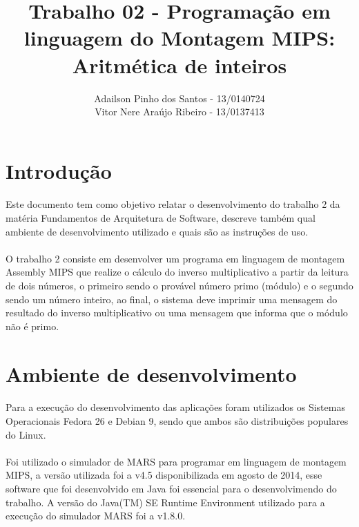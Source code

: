 \documentclass[a4paper, 12pt]{article}
\begin{document}
\title{Trabalho 02 - Programa\c{c}\~ao em linguagem do Montagem MIPS: Aritm\'etica de inteiros}
\author{Adailson Pinho dos Santos - 13/0140724\\
Vitor Nere Ara\'ujo Ribeiro - 13/0137413}
\date{}
\maketitle

\newpage

\tableofcontents

\newpage

\section{Introdu\c{c}\~ao}
	\paragraph{}	Este documento tem como objetivo relatar o desenvolvimento do trabalho 2 da mat\'eria Fundamentos de Arquitetura de Software, descreve tamb\'em qual ambiente de desenvolvimento utilizado e quais s\~ao as instru\c{c}\~oes de uso. 
	\paragraph{}	O trabalho 2 consiste em desenvolver um programa em linguagem de montagem Assembly MIPS que realize o c\'alculo do inverso multiplicativo a partir da leitura de dois n\'umeros, o primeiro sendo o prov\'avel n\'umero primo (m\'odulo) e o segundo sendo um n\'umero inteiro, ao final, o sistema deve imprimir uma mensagem do resultado do inverso multiplicativo ou uma mensagem que informa que o m\'odulo n\~ao \'e primo. 
\section{Ambiente de desenvolvimento}
    \paragraph{}	Para a execu\c{c}\~ao do desenvolvimento das aplica\c{c}\~oes foram utilizados os Sistemas Operacionais Fedora 26 e Debian 9, sendo que ambos s\~ao distribui\c{c}\~oes populares do Linux. 
    \paragraph{}	Foi utilizado o simulador de MARS para programar em linguagem de montagem MIPS, a vers\~ao utilizada foi a v4.5 disponibilizada em agosto de 2014, esse software que foi desenvolvido em Java foi essencial para o desenvolvimendo do trabalho. A vers\~ao do Java(TM) SE Runtime Environment utilizado para a execu\c{c}\~ao do simulador MARS foi a v1.8.0.
\end{document}
